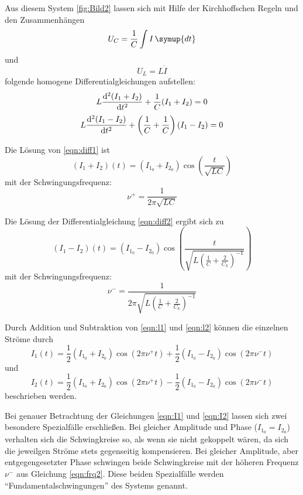Aus diesem System \ref{fig:Bild2} lassen sich mit Hilfe der Kirchhoffschen Regeln und den Zusammenhängen
\begin{equation*}
    U_C=\frac{1}{C}\int I \, \symup{dt}
\end{equation*}
und
\begin{equation*}
    U_L=L\dot{I}
\end{equation*}
folgende homogene Differentialgleichungen aufstellen:
\begin{equation}
\label{eqn:diff1}
    L\dv[2]{(I_1+I_2)}{t}+\frac{1}{C}(I_1+I_2)=0 
\end{equation}
\begin{equation}
\label{eqn:diff2}
    L\dv[2]{(I_1-I_2)}{t}+\left(\frac{1}{C}+\frac{1}{C}\right)(I_1-I_2)=0 
\end{equation}

Die Lösung von \eqref{eqn:diff1} ist 
\begin{equation}
\label{eqn:l1}
    (I_1+I_2)(t)=(I_{1_0}+I_{2_0})\cos(\frac{t}{\sqrt{LC}})
\end{equation}
mit der Schwingungsfrequenz:
\begin{equation}
\label{eqn:frq1}
    \nu^+=\frac{1}{2\pi\sqrt{LC}}
\end{equation}

Die Lösung der Differentialgleichung \eqref{eqn:diff2} ergibt sich zu
\begin{equation}
\label{eqn:l2}
    (I_1-I_2)(t)=(I_{1_0}-I_{2_0})\cos(\frac{t}{\sqrt{L\left(\frac{1}{C}+\frac{2}{C_k}\right)^{-1}}})
\end{equation}
mit der Schwingungsfrequenz:
\begin{equation}
\label{eqn:frq2}
    \nu^-=\frac{1}{2\pi\sqrt{L\left(\frac{1}{C}+\frac{2}{C_k}\right)^{-1}}}
\end{equation}

Durch Addition und Subtraktion von \eqref{eqn:l1} und \eqref{eqn:l2} können die einzelnen Ströme durch
\begin{equation}
\label{eqn:I1}
    I_1(t)=\frac{1}{2}(I_{1_0}+I_{2_0})\cos(2\pi\nu^+t)+\frac{1}{2}(I_{1_0}-I_{2_0})\cos(2\pi\nu^-t)
\end{equation}
und 
\begin{equation} 
\label{eqn:I2}
    I_2(t)=\frac{1}{2}(I_{1_0}+I_{2_0})\cos(2\pi\nu^+t)-\frac{1}{2}(I_{1_0}-I_{2_0})\cos(2\pi\nu^-t)
\end{equation}
beschrieben werden.

Bei genauer Betrachtung der Gleichungen \eqref{eqn:I1} und \eqref{eqn:I2} lassen sich zwei besondere Spezialfälle erschließen.
Bei gleicher Amplitude und Phase ($I_{1_0}=I_{2_0}$) verhalten sich die Schwingkreise so, als wenn sie nicht gekoppelt wären, da sich die 
jeweilgen Ströme stets gegenseitig kompensieren. Bei gleicher Amplitude, aber entgegengesetzter Phase schwingen beide Schwingkreise mit 
der höheren Frequenz $\nu^-$ aus Gleichung \eqref{eqn:frq2}. Diese beiden Spezialfälle werden \enquote{Fundamentalschwingungen} des Systems genannt.

